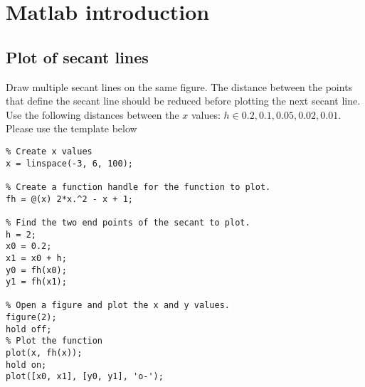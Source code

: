 \section{Matlab introduction}






\subsection{Plot of secant lines}

\begin{ex}
Draw multiple secant lines on the same figure.
The distance between the points that define the secant line
should be reduced before plotting the next secant line.
Use the following distances between the $x$ values:
$h \in {0.2, 0.1, 0.05, 0.02, 0.01}$.
Please use the template below
\begin{lstlisting}
% Create x values
x = linspace(-3, 6, 100);

% Create a function handle for the function to plot.
fh = @(x) 2*x.^2 - x + 1;

% Find the two end points of the secant to plot.
h = 2;
x0 = 0.2;
x1 = x0 + h;
y0 = fh(x0);
y1 = fh(x1);

% Open a figure and plot the x and y values.
figure(2);
hold off;
% Plot the function
plot(x, fh(x));
hold on;
plot([x0, x1], [y0, y1], 'o-');
\end{lstlisting}
\end{ex}

%
%
%
%
%
%
%
%
%
%
%
%
%
%
%
%
%
%
%
%

